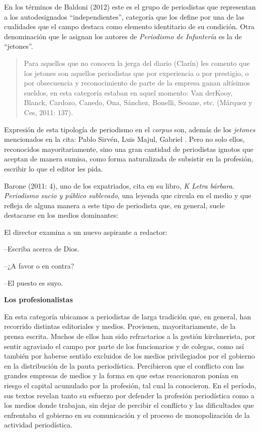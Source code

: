 En los términos de Baldoni (2012) este es el grupo de periodistas que representan a los autodesignados ``independientes'', categoría que los define por una de las cualidades que el campo destaca como elemento identitario de su condición. Otra denominación que le asignan los autores de \emph{Periodismo de Infantería} es la de ``jetones''.

\begin{quote}
	Para aquellos que no conocen la jerga del diario (Clarín) les comento que los jetones son aquellos periodistas que por experiencia o por prestigio, o por obsecuencia y reconocimiento de parte de la empresa ganan altísimos sueldos, en esta categoría estaban en aquel momento: Van derKooy, Blanck, Cardozo, Canedo, Ona, Sánchez, Bonelli, Seoane, etc. (Márquez y Ces, 2011: 137).
\end{quote}


Expresión de esta tipología de periodismo en el \emph{corpus} son, además de los \emph{jetones} mencionados en la cita: Pablo Sirvén, Luis Majul, Gabriel . Pero no solo ellos, reconocidos mayoritariamente, sino una gran cantidad de periodistas ignotos que aceptan de manera sumisa, como forma naturalizada de subsistir en la profesión, escribir lo que el editor les pida.

Barone (2011: 4), uno de los expatriados, cita en su libro, \emph{K Letra bárbara. Periodismo sucio y público sublevado}, una leyenda que circula en el medio y que refleja de alguna manera a este tipo de periodista que, en general, suele destacarse en los medios dominantes:

El director examina a un nuevo aspirante a redactor:

--Escriba acerca de Dios.

--¿A favor o en contra?

--El puesto es suyo.

\textbf{Los profesionalistas}

En esta categoría ubicamos a periodistas de larga tradición que, en general, han recorrido distintas editoriales y medios. Provienen, mayoritariamente, de la prensa escrita. Muchos de ellos han sido refractarios a la gestión kirchnerista, por sentir agraviado el campo por parte de los funcionarios y de colegas, como así también por haberse sentido excluidos de los medios privilegiados por el gobierno en la distribución de la pauta periodística. Percibieron que el conflicto con las grandes empresas de medios y la forma en que estas reaccionaron ponían en riesgo el capital acumulado por la profesión, tal cual la conocieron. En el período, sus textos revelan tanto su esfuerzo por defender la profesión periodística como a los medios donde trabajan, sin dejar de percibir el conflicto y las dificultades que enfrentaba el gobierno en su comunicación y el proceso de monopolización de la actividad periodística.

